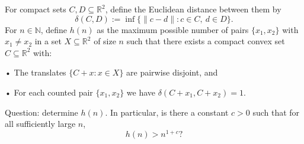 For compact sets $C,D\subseteq\mathbb{R}^2$, define the Euclidean distance between them by
\[
\delta(C,D):=\inf\{\|c-d\|: c\in C,\ d\in D\}.
\]
For $n\in\mathbb{N}$, define $h(n)$ as the maximum possible number of pairs $\{x_1,x_2\}$ with $x_1\ne x_2$ in a set $X\subseteq\mathbb{R}^2$ of size $n$ such that there exists a compact convex set $C\subseteq\mathbb{R}^2$ with:

• The translates $\{C+x: x\in X\}$ are pairwise disjoint, and

• For each counted pair $\{x_1,x_2\}$ we have $\delta(C+x_1, C+x_2)=1$.

Question: determine $h(n)$. In particular, is there a constant $c>0$ such that for all sufficiently large $n$,
\[
 h(n) > n^{1+c}?
\]
